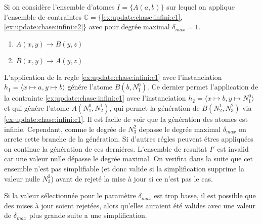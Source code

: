 \begin{example}
    \label{ex:update:chase:infini}
    Si on considère l'ensemble d'atomes $I = \{A(a, b)\}$ sur lequel on applique l'ensemble de contraintes $\mathbb{C} = \{$\ref{ex:update:chase:infini:c1}, \ref{ex:update:chase:infini:c2}$\}$ avec pour degrée maximal $\delta_{max} = 1$.
    \begin{multicols}{2}
        \begin{enumerate}[label=\textbf{$c_\arabic*$ :},ref=$c_\arabic*$]
            \centering
            \item $A(x, y) \to B(y, z)$ \label{ex:update:chase:infini:c1}
            \item $B(x, y) \to A(y, z)$ \label{ex:update:chase:infini:c2}
        \end{enumerate}
    \end{multicols}

    L'application de la regle \ref{ex:update:chase:infini:c1} avec l'instanciation $h_1 = \langle x \mapsto a, y \mapsto b \rangle$ génére l'atome $B(b, N_1^0)$.
    Ce dernier permet l'application de la contrainte \ref{ex:update:chase:infini:c1} avec l'instanciation $h_2 = \langle x \mapsto b, y \mapsto N_1^0 \rangle$ et qui génére l'atome $A(N_1^0, N_2^1)$, qui permet la génération de $B(N_2^1, N_3^2)$ via \ref{ex:update:chase:infini:c1}.
    Il est facile de voir que la génération des atomes est infinie.
    Cependant, comme le degrée de $N_3^2$ depasse le degrée maximal $\delta_{max}$ on arrete cette branche de la génération.
    Si d'autres régles peuvent étres appliquées on continue la génération de ces derniéres.
    L'ensemble de resultat $I'$ est invalid car une valeur nulle dépasse le degrée maximal.
    On verifira dans la suite que cet ensemble n'est pas simplifiable (et donc valide si la simplification supprime la valeur nulle $N_3^2$) avant de rejeté la mise à jour si ce n'est pas le cas.
\end{example}

Si la valeur sélectionnée pour le paramètre $\delta_{max}$ est trop basse, il est possible que des mises à jour soient rejetées, alors qu'elles auraient été valides avec une valeur de $\delta_{max}$ plus grande suite a une simplification.

